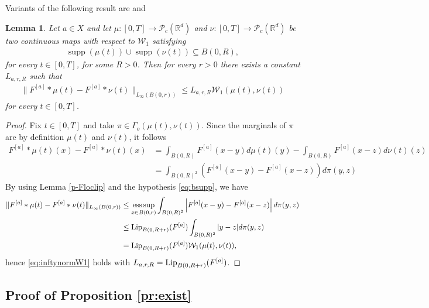 \documentclass[A4paper,11pt]{article}
\newtheorem{lemma}[theorem]{Lemma}
\theoremstyle{definition}
\newcommand{\Lip}{\textup{Lip}}
\newcommand{\R}{\mathbb{R}}
\newcommand{\W}{\mathcal{W}}
\DeclareMathOperator{\supp}{supp}
\DeclareMathOperator*{\esssup}{ess\,sup}
\newcommand{\Fun}[1]{F^{[#1]}}
\begin{document}
Variants of the following result are \cite[Lemma 6.7]{MFOC} and \cite[Lemma 4.7]{CanCarRos10}

\begin{lemma}\label{p-lipkernel}
Let $a \in X$ and let $\mu:[0,T] \rightarrow \mathcal{P}_c(\R^d)$ and $\nu: [0,T] \to \mathcal{P}_c(\R^d)$ be two continuous maps with respect to $\W_1$ satisfying
\begin{align}\label{eq:bsupp}
\supp(\mu(t)) \cup \supp(\nu(t)) \subseteq B(0,R),
\end{align}
for every $t \in [0,T]$, for some $R > 0$. Then for every $r > 0$ there exists a constant $L_{a,r,R}$ such that
\begin{align}\label{eq:inftynormW1}
\|\Fun{a} * \mu(t) - \Fun{a} * \nu(t)\|_{L_{\infty}(B(0,r))} \leq L_{a,r,R} \W_1(\mu(t),\nu(t))
\end{align}
for every $t \in [0,T]$.
\end{lemma}
\begin{proof}
Fix $t \in [0,T]$ and take $\pi \in \Gamma_o(\mu(t),\nu(t))$. Since the marginals of $\pi$ are by definition $\mu(t)$ and $\nu(t)$, it follows
\begin{align*}
\Fun{a} * \mu(t)(x) - \Fun{a} * \nu(t)(x) &= \int_{B(0,R)} \Fun{a}(x-y) d\mu(t)(y) - \int_{B(0,R)} \Fun{a}(x-z) d\nu(t)(z)  \\
&= \int_{B(0,R)^2} \left(\Fun{a}(x-y) - \Fun{a}(x-z)\right) d\pi(y,z)
\end{align*}
By using Lemma \ref{p-Floclip} and the hypothesis \eqref{eq:bsupp}, we have
\begin{align*}
\|\Fun{a} * \mu(t) - \Fun{a} * \nu(t)\|_{L_{\infty}(B(0,r))} &\leq \esssup_{x \in B(0,r)} \int_{B(0,R)^2} \left|\Fun{a}(x-y) - \Fun{a}(x-z)\right| d\pi(y,z) \\
&\leq \Lip_{B(0,R+r)}(\Fun{a}) \int_{B(0,R)^2} |y - z| d\pi(y,z) \\
&= \Lip_{B(0,R+r)}(\Fun{a}) \W_1(\mu(t),\nu(t)),
\end{align*}
hence \eqref{eq:inftynormW1} holds with $L_{a,r,R} = \Lip_{B(0,R+r)}(\Fun{a})$.
\end{proof}


\subsection{Proof of Proposition \ref{pr:exist}}\label{ap2}
\end{document}
